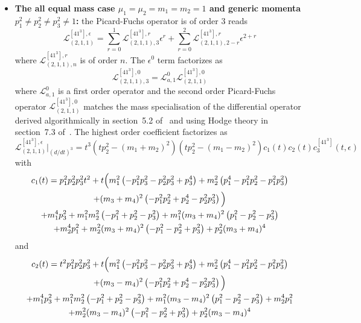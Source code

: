 \documentclass[a4paper,12pt]{article}
\numberwithin{equation}{section}
\numberwithin{figure}{section}
\begin{document}
\begin{itemize}
	
	\item \textbf{ The all equal mass case
		$\mu_1=\mu_2=m_1=m_2=1$ and generic momenta $p_1^2\neq p_2^2\neq
		p_3^2\neq 1$:} the Picard-Fuchs operator is of order 3
	reads
	\begin{equation}
		\mathscr{L}_{(2,1,1)}^{[41^3],\epsilon}=\sum_{r=0}^1
		\mathscr{L}_{(2,1,1),3}^{[41^3],r} \epsilon^r+ \sum_{r=0}^2   \mathscr{L}_{(2,1,1),2-r}^{[41^3],r} \epsilon^{2+r}
	\end{equation}
	where $ \mathscr{L}_{(2,1,1),n}^{[41^3],r}$  is of order $n$. The
	$\epsilon^0$ term factorizes as
	\begin{equation}
		\mathscr{L}_{(2,1,1),3}^{[41^3],0}=\mathscr{L}_{a,1}^0 \mathscr{L}_{(2,1,1)}^{[41^3],0}      
	\end{equation}
	where $\mathscr{L}_{a,1}^0$ is a first order operator   and the second order
	Picard-Fuchs operator  $\mathscr{L}_{(2,1,1)}^{[41^3] ,0}
	$ matches the mass specialisation of the differential
	operator derived algorithmically in section~5.2
	of~\cite{Lairez:2022zkj} and using Hodge theory in
	section~7.3 of~\cite{Doran:2023yzu}.
	The highest order coefficient factorizes as
	\begin{equation}
		\mathscr{L}_{(2,1,1)}^{[41^3],\epsilon}\Big|_{(d/dt)^3}=t^3(tp_2^2-(m_1+m_2)^2)(tp_2^2-(m_1-m_2)^2) c_1(t) c_2(t)c^{[41^3]}_3(t,\epsilon)   
	\end{equation}
	with
	\begin{multline}
		c_1(t)=   p_{1}^2 p_{2}^2 p_{3}^2 t^2 +t\Big(m_{1}^2 \left(-p_{1}^2 p_{3}^2-p_{2}^2 p_{3}^2+p_{3}^4\right)+m_{2}^2 \left(p_{1}^4-p_{1}^2
		p_{2}^2-p_{1}^2 p_{3}^2\right)\cr+(m_{3}+m_{4})^2
		\left(-p_{1}^2 p_{2}^2+p_{2}^4-p_{2}^2
		p_{3}^2\right)\Big)\cr
		+m_{1}^4 p_{3}^2+m_{1}^2 m_{2}^2 \left(-p_{1}^2+p_{2}^2-p_{3}^2\right)+m_{1}^2 (m_{3}+m_{4})^2
		\left(p_{1}^2-p_{2}^2-p_{3}^2\right)\cr+m_{2}^4 p_{1}^2+m_{2}^2 (m_{3}+m_{4})^2
		\left(-p_{1}^2-p_{2}^2+p_{3}^2\right)+p_{2}^2 (m_{3}+m_{4})^4
	\end{multline}
	and
	\begin{multline}
		c_2(t)=t^2 p_{1}^2 p_{2}^2 p_{3}^2+t\Big(m_{1}^2 \left(-p_{1}^2 p_{3}^2-p_{2}^2 p_{3}^2+p_{3}^4\right)+m_{2}^2 \left(p_{1}^4-p_{1}^2
		p_{2}^2-p_{1}^2 p_{3}^2\right)\cr+(m_{3}-m_{4})^2 \left(-p_{1}^2 p_{2}^2+p_{2}^4-p_{2}^2 p_{3}^2\right)\Big)\cr
		+m_{1}^4 p_{3}^2+m_{1}^2 m_{2}^2 \left(-p_{1}^2+p_{2}^2-p_{3}^2\right)+m_{1}^2 (m_{3}-m_{4})^2
		\left(p_{1}^2-p_{2}^2-p_{3}^2\right)+m_{2}^4 p_{1}^2\cr+m_{2}^2 (m_{3}-m_{4})^2
		\left(-p_{1}^2-p_{2}^2+p_{3}^2\right)+p_{2}^2 (m_{3}-m_{4})^4

\end{multline}
\end{itemize}
\end{document}
